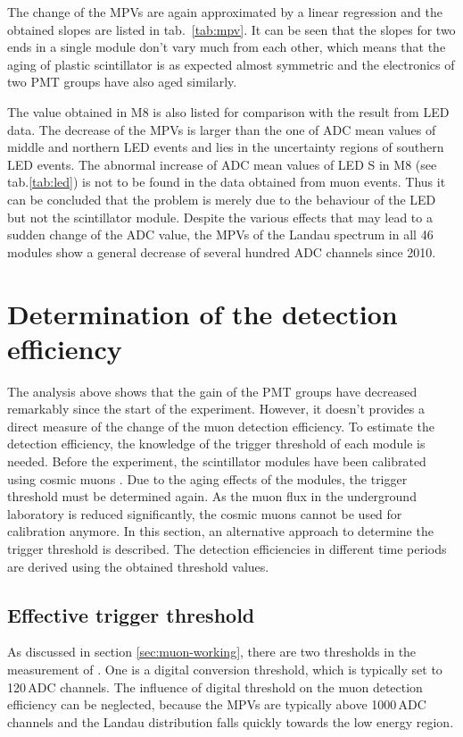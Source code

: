 The change of the MPVs are again approximated by a linear regression and the obtained slopes are listed in tab.\ \ref{tab:mpv}. It can be seen that the slopes for two ends in a single module don't vary much from each other, which means that the aging of plastic scintillator is as expected almost symmetric and the electronics of two PMT groups have also aged similarly.

The value obtained in M8 is also listed for comparison with the result from LED data. The decrease of the MPVs is larger than the one of ADC mean values of middle and northern LED events and lies in the uncertainty regions of southern LED events. The abnormal increase of ADC mean values of LED S in M8 (see tab.\ref{tab:led}) is not to be found in the data obtained from muon events. Thus it can be concluded that the problem is merely due to the behaviour of the LED but not the scintillator module.
Despite the various effects that may lead to a sudden change of the ADC value, the MPVs of the Landau spectrum in all 46 modules show a general decrease of several hundred ADC channels since 2010.



\section{Determination of the detection efficiency}
The analysis above shows that the gain of the PMT groups have decreased remarkably since the start of the experiment. However, it doesn't provides a direct measure of the change of the muon detection efficiency. To estimate the detection efficiency, the knowledge of the trigger threshold of each module is needed. Before the experiment, the scintillator modules have been calibrated using cosmic muons \cite{Hab04}. Due to the aging effects of the modules, the trigger threshold must be determined again. As the muon flux in the underground laboratory is reduced significantly, the cosmic muons cannot be used for calibration anymore. In this section, an alternative approach to determine the trigger threshold is described. The detection efficiencies in different time periods are derived using the obtained threshold values.

\subsection{Effective trigger threshold}
As discussed in section \ref{sec:muon-working}, there are two thresholds in the measurement of \mvs. One is a digital conversion threshold, which is typically set to 120\,ADC channels. The influence of digital threshold on the muon detection efficiency can be neglected, because the MPVs are typically above 1000\,ADC channels and the Landau distribution falls quickly towards the low energy region.

